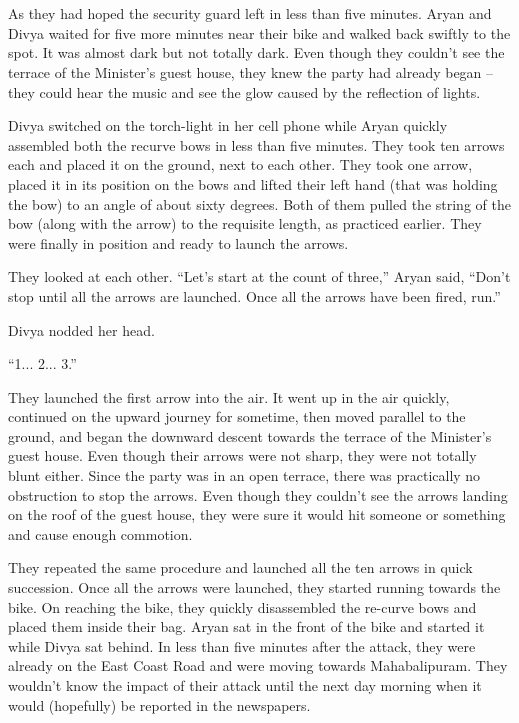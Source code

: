 \chapter{}

As they had hoped the security guard left in less than five minutes. Aryan and
Divya waited for five more minutes near their bike and walked back swiftly to
the spot. It was almost dark but not totally dark. Even though they couldn't see
the terrace of the Minister's guest house, they knew the party had already began
– they could hear the music and see the glow caused by the reflection of lights.


Divya switched on the torch-light in her cell phone while Aryan quickly
assembled both the recurve bows in less than five minutes. They took ten arrows
each and placed it on the ground, next to each other. They took one arrow,
placed it in its position on the bows and lifted their left hand (that was
holding the bow) to an angle of about sixty degrees. Both of them pulled the
string of the bow (along with the arrow) to the requisite length, as practiced
earlier. They were finally in position and ready to launch the arrows.

They looked at each other. “Let's start at the count of three,” Aryan said,
“Don't stop until all the arrows are launched. Once all the arrows have been
fired, run.”

Divya nodded her head.

“1... 2... 3.”

They launched the first arrow into the air. It went up in the air quickly,
continued on the upward journey for sometime, then moved parallel to the ground,
and began the downward descent towards the terrace of the Minister's guest
house. Even though their arrows were not sharp, they were not totally blunt
either. Since the party was in an open terrace, there was practically no
obstruction to stop the arrows. Even though they couldn't see the arrows landing
on the roof of the guest house, they were sure it would hit someone or something
and cause enough commotion.

They repeated the same procedure and launched all the ten arrows in quick
succession. Once all the arrows were launched, they started running towards the
bike. On reaching the bike, they quickly disassembled the re-curve bows and
placed them inside their bag. Aryan sat in the front of the bike and started it
while Divya sat behind. In less than five minutes after the attack, they were
already on the East Coast Road and were moving towards Mahabalipuram. They
wouldn't know the impact of their attack until the next day morning when it
would (hopefully) be reported in the newspapers.

